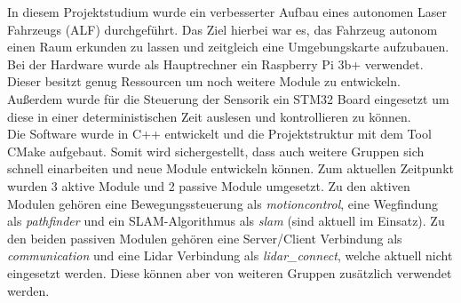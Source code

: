 
\vspace{15.0mm}




In diesem Projektstudium wurde ein verbesserter Aufbau eines autonomen Laser Fahrzeugs (ALF) durchgeführt. Das Ziel hierbei war es, das Fahrzeug autonom einen Raum erkunden zu lassen und zeitgleich eine Umgebungskarte aufzubauen.\\
Bei der Hardware wurde als Hauptrechner ein Raspberry Pi 3b+ verwendet. Dieser besitzt genug Ressourcen um noch weitere Module zu entwickeln. Außerdem wurde für die Steuerung der Sensorik ein STM32 Board eingesetzt um diese in einer deterministischen Zeit auslesen und kontrollieren zu können.\\
Die Software wurde in C++ entwickelt und die Projektstruktur mit dem Tool CMake aufgebaut. Somit wird sichergestellt, dass auch weitere Gruppen sich schnell einarbeiten und neue Module entwickeln können. Zum aktuellen Zeitpunkt wurden 3 aktive Module und 2 passive Module umgesetzt. Zu den aktiven Modulen gehören eine Bewegungssteuerung als \textit{motioncontrol}, eine Wegfindung als \textit{pathfinder} und ein SLAM-Algorithmus als \textit{slam} (sind aktuell im Einsatz). Zu den beiden passiven Modulen gehören eine Server/Client Verbindung als \textit{communication} und eine Lidar Verbindung als \textit{lidar\_connect}, welche aktuell nicht eingesetzt werden. Diese können aber von weiteren Gruppen zusätzlich verwendet werden.  
